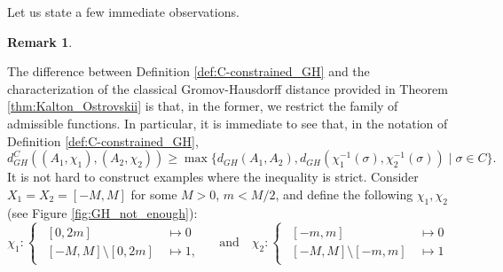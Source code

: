 \documentclass[8pt,a4paper,oneside,english,english]{article}
\theoremstyle{plain}
\theoremstyle
{plain}
\theoremstyle{definition}
\newtheorem{remark}[theorem]{Remark}%
\newcommand{\GH}{d_{GH}}
\newcommand{\MP}[1]{(A_{#1},\chi_{#1})}
\begin{document}
Let us state a few immediate observations.
\begin{remark}\label{rem:C-constrained_GH_and_other_GH}
	\begin{compactenum}[(i)]
		\item The difference between Definition \ref{def:C-constrained_GH} and the characterization of the classical Gromov-Hausdorff distance provided in Theorem \ref{thm:Kalton_Ostrovskii} is that, in the former, we restrict the family of admissible functions. In particular, it is immediate to see that, in the notation of Definition \ref{def:C-constrained_GH},
		\[
    		\GH^C(\MP{1},\MP{2})\geq\max\{\GH(A_1,A_2),\GH(\chi_1^{-1}(\sigma),\chi_2^{-1}(\sigma))\mid\sigma\in C\}.
		\]
        It is not hard to construct examples where the inequality is strict. Consider $X_1=X_2=[-M,M]$ for some $M>0$, $m<M/2$, and define the following $\chi_1, \chi_2$ (see Figure \ref{fig:GH_not_enough}):
        \[
            \chi_1\colon\begin{cases}
                \begin{aligned}
                    [0,2m]&\,\mapsto 0\\
                    [-M,M]\setminus[0,2m]&\,\mapsto 1,
                \end{aligned}
            \end{cases}\quad\text{and}\quad
             \chi_2\colon\begin{cases}
                \begin{aligned}
                    [-m,m]&\,\mapsto 0\\
                    [-M,M]\setminus[-m,m]&\,\mapsto 1
                \end{aligned}
            \end{cases}
        \]
        \begin{figure}[h!]
            \centering
\end{figure}
\end{compactenum}
\end{remark}
\end{document}
